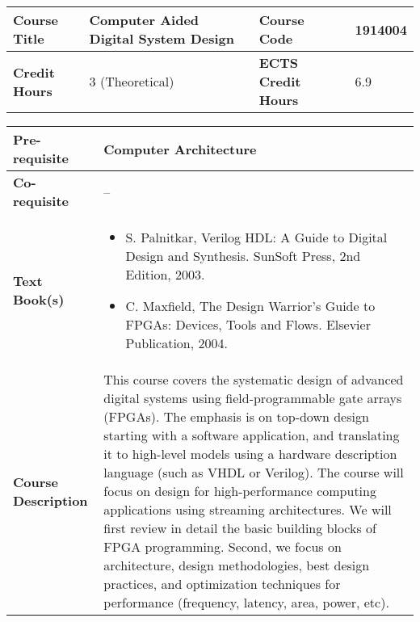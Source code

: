 \documentclass[12pt]{article}
\begin{document}
\begin{minipage}{\textwidth}
\begin{tabularx}{\textwidth}{|l|X|l|X|}
\hline
\textbf{Course Title}       &  Computer Aided Digital System Design & \textbf{Course Code}       &  1914004 \\ \hline
\textbf{Credit Hours}       &  3 (Theoretical) & \textbf{ECTS Credit Hours}       & 6.9  \\ \hline
\end{tabularx}

\begin{tabularx}{\textwidth}{|l|X|}
\hline
\textbf{Pre-requisite}      &  Computer Architecture \\ \hline
\textbf{Co-requisite}       &  -- \\ \hline
\textbf{Text Book(s)}      & \begin{minipage}{.70\textwidth}
					\begin{itemize} \itemsep-0.4em
						\vspace{3mm}
						\item S. Palnitkar, Verilog HDL: A Guide to Digital Design and Synthesis. SunSoft Press, 2nd Edition, 2003.
						\item C. Maxfield, The Design Warrior's Guide to FPGAs: Devices, Tools and Flows. Elsevier Publication, 2004.
						\vspace{3mm}
					\end{itemize}
				\end{minipage}  \\ \hline
\textbf{Course Description} & \begin{minipage}{.70\textwidth}
					\vspace{3mm}
					
					This course covers the systematic design of advanced digital systems using field-programmable gate arrays (FPGAs). The emphasis is on top-down design starting with a software application, and translating it to high-level models using a hardware description language (such as VHDL or Verilog). The course will focus on design for high-performance computing applications using streaming architectures. We will first review in detail the basic building blocks of FPGA programming. Second, we focus on architecture, design methodologies, best design practices, and optimization techniques for performance (frequency, latency, area, power, etc).

					\vspace{3mm}
					\end{minipage} \\ \hline
\end{tabularx}
\end{minipage}
\end{document}
